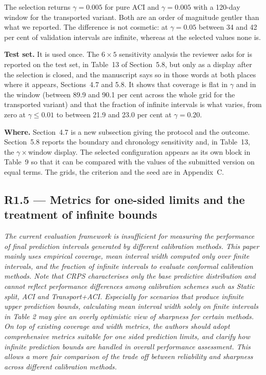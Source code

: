\documentclass[11pt,a4paper]{article}
\newenvironment{revcomment}
  {\begin{mdframed}[backgroundcolor=quotebg,linecolor=quoterule,linewidth=0.4pt,
    innertopmargin=6pt,innerbottommargin=6pt,skipabove=8pt,skipbelow=8pt]\itshape}
  {\end{mdframed}}
\newcommand{\where}[1]{\textbf{Where.} #1}
\begin{document}
The selection returns $\gamma=0.005$ for pure ACI and $\gamma=0.005$ with a 120-day window for the transported variant. Both are an order of magnitude gentler than what we reported. The difference is not cosmetic: at $\gamma=0.05$ between 34 and 42 per cent of validation intervals are infinite, whereas at the selected values none is.

\textbf{Test set.} It is used once. The $6\times5$ sensitivity analysis the reviewer asks for is reported on the test set, in Table~13 of Section~5.8, but only as a display after the selection is closed, and the manuscript says so in those words at both places where it appears, Sections~4.7 and 5.8. It shows that coverage is flat in $\gamma$ and in the window (between 89.9 and 90.1 per cent across the whole grid for the transported variant) and that the fraction of infinite intervals is what varies, from zero at $\gamma\le0.01$ to between 21.9 and 23.0 per cent at $\gamma=0.20$.

\where{Section~4.7 is a new subsection giving the protocol and the outcome. Section~5.8 reports the boundary and chronology sensitivity and, in Table~13, the $\gamma\times$window display. The selected configuration appears as its own block in Table~9 so that it can be compared with the values of the submitted version on equal terms. The grids, the criterion and the seed are in Appendix~C.}

\subsection*{R1.5 --- Metrics for one-sided limits and the treatment of infinite bounds}

\begin{revcomment}
The current evaluation framework is insufficient for measuring the performance of final prediction intervals generated by different calibration methods. This paper mainly uses empirical coverage, mean interval width computed only over finite intervals, and the fraction of infinite intervals to evaluate conformal calibration methods. Note that CRPS characterises only the base predictive distribution and cannot reflect performance differences among calibration schemes such as Static split, ACI and Transport+ACI. Especially for scenarios that produce infinite upper prediction bounds, calculating mean interval width solely on finite intervals in Table 2 may give an overly optimistic view of sharpness for certain methods. On top of existing coverage and width metrics, the authors should adopt comprehensive metrics suitable for one sided prediction limits, and clarify how infinite prediction bounds are handled in overall performance assessment. This allows a more fair comparison of the trade off between reliability and sharpness across different calibration methods.
\end{revcomment}
\end{document}
